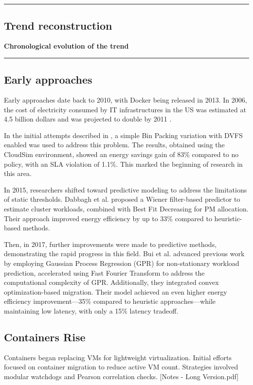 {\color{gray}\hrule}
\begin{center}
\section{Trend reconstruction}
\textbf{Chronological evolution of the trend}
\bigskip
\end{center}
{\color{gray}\hrule}
\begin{multicols}{2}
\subsection{Early approaches}
Early approaches date back to 2010, with Docker being released in 2013. In 2006, the cost of electricity consumed by IT infrastructures in the US was estimated at 4.5 billion dollars and was projected to double by 2011 \cite{beloglazov_energy_2010}.

In the initial attempts described in \cite{beloglazov_energy_2010}, a simple Bin Packing variation with DVFS enabled was used to address this problem. The results, obtained using the CloudSim environment, showed an energy savings gain of 83\% compared to no policy, with an SLA violation of 1.1\%. This marked the beginning of research in this area.

In 2015, researchers shifted toward predictive modeling to address the limitations of static thresholds. Dabbagh et al. \cite{dabbagh_energy-efficient_2015} proposed a Wiener filter-based predictor to estimate cluster workloads, combined with Best Fit Decreasing for PM allocation. Their approach improved energy efficiency by up to 33\% compared to heuristic-based methods.

Then, in 2017, further improvements were made to predictive methods, demonstrating the rapid progress in this field. Bui et al. \cite{bui_energy_2017} advanced previous work by employing Gaussian Process Regression (GPR) for non-stationary workload prediction, accelerated using Fast Fourier Transform to address the computational complexity of GPR. Additionally, they integrated convex optimization-based migration. Their model achieved an even higher energy efficiency improvement—35\% compared to heuristic approaches—while maintaining low latency, with only a 15\% latency tradeoff.

\subsection{Containers Rise}
Containers began replacing VMs for lightweight virtualization. Initial efforts focused on container migration to reduce active VM count. Strategies involved modular watchdogs and Pearson correlation checks. [Notes - Long Version.pdf]


\end{multicols}
